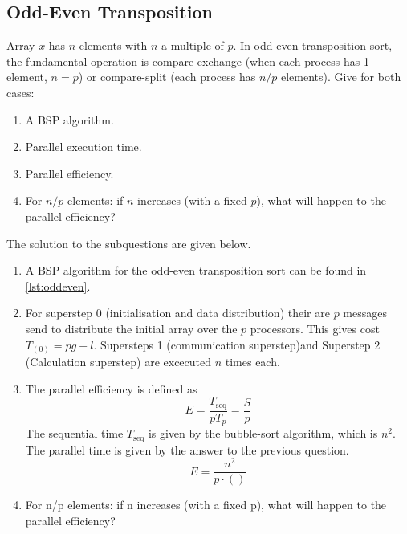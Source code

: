 \documentclass[../main.tex]{subfiles}
\begin{document}
\subsection{Odd-Even Transposition}
\begin{question}
Array $x$ has $n$ elements with $n$ a multiple of $p$. In odd-even transposition sort, the fundamental operation is compare-exchange (when each process has 1 element, $n = p$) or compare-split (each process has $n/p$ elements). Give for both cases:
\begin{enumerate}
	\item A BSP algorithm.
	\item Parallel execution time. 
	\item Parallel efficiency.
	\item For $n/p$ elements: if $n$ increases (with a fixed $p$), what will happen to the parallel efficiency?
\end{enumerate}

\end{question}
\begin{solution} The solution to the subquestions are given below.
\begin{enumerate}
	\item A BSP algorithm for the odd-even transposition sort can be found in \autoref{lst:oddeven}.
		
	\item For superstep 0 (initialisation and data distribution) their are $p$ messages send to distribute the initial array over the $p$ processors. This gives cost $T_{(0)} = pg + l$. Supersteps 1 (communication superstep)and Superstep 2 (Calculation superstep) are excecuted $n$ times each. 
	\item The parallel efficiency is defined as
	\begin{equation}
		E = \frac{T_\text{seq}}{p T_p} = \frac{S}{p}
	\end{equation}
	The sequential time $T_\text{seq}$ is given by the bubble-sort algorithm, which is $n^2$. The parallel time is given by the answer to the previous question.
	\begin{equation}
		E = \frac{n^2}{p \cdot ()}
	\end{equation}
	\item For n/p elements: if n increases (with a fixed p), what will happen to the parallel efficiency?
\end{enumerate}
\end{solution}
\end{document}
